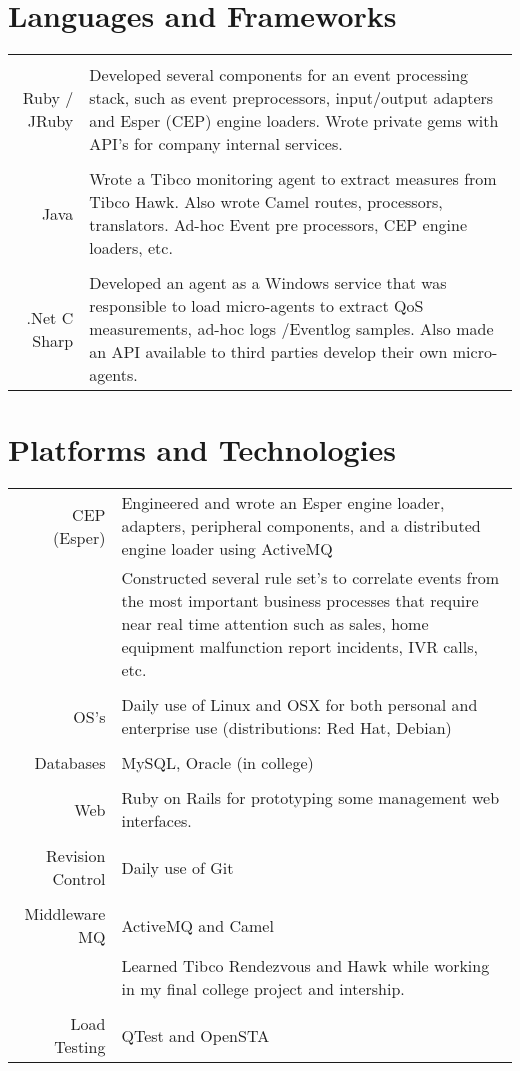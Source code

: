 \documentclass[a4paper,10pt]{article}
\begin{document}
\section{Languages and Frameworks}
\begin{tabular}{r|p{11cm}}
\multicolumn{2}{c}{} \\
	Ruby / JRuby
	& Developed several components for an event processing stack, such as event preprocessors, input/output adapters and Esper (CEP) engine loaders. 
	Wrote private gems with API's for company internal services.\\
\multicolumn{2}{c}{} \\
	Java
	&  Wrote a Tibco monitoring agent to extract measures from Tibco Hawk. Also wrote Camel routes, processors, translators. Ad-hoc Event pre processors, CEP engine loaders, etc.\\
\multicolumn{2}{c}{} \\
	.Net C Sharp
	&  Developed an agent as a Windows service that was responsible to load micro-agents to extract QoS measurements, ad-hoc logs /Eventlog samples. 
	Also made an API available to third parties develop their own micro-agents.\\
\end{tabular}

\section{Platforms and Technologies}
\begin{tabular}{r|p{11cm}}
	CEP (Esper) 
	& Engineered and wrote an Esper engine loader, adapters, peripheral components, and a distributed engine loader using ActiveMQ\\
	& Constructed several rule set's to correlate events from the most important business processes that require near real time attention such as sales, home equipment malfunction report incidents,
	    IVR calls, etc.\\
\multicolumn{2}{c}{} \\ 
	OS's 
	&  Daily use of Linux and OSX for both personal and enterprise use (distributions: Red Hat, Debian) \\
\multicolumn{2}{c}{} \\
	Databases 
	& MySQL, Oracle (in college)\\
\multicolumn{2}{c}{} \\
	Web 
	& Ruby on Rails for prototyping some management web interfaces.\\
\multicolumn{2}{c}{} \\
	Revision Control 
	& Daily use of Git\\
\multicolumn{2}{c}{} \\
	Middleware \ MQ 
	& ActiveMQ and Camel\\
	& Learned Tibco Rendezvous and Hawk while working in my final college project and intership. \\
\multicolumn{2}{c}{} \\
	Load Testing 
	& QTest and OpenSTA
\end{tabular}
\end{document}
